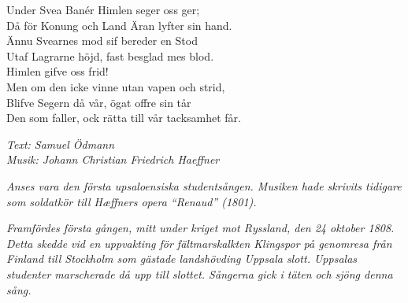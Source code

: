 \vspace{10pt}
Under Svea Banér Himlen seger oss ger;\\
Då för Konung och Land Äran lyfter sin hand.\\
Ännu Svearnes mod sif bereder en Stod\\
Utaf Lagrarne höjd, fast besglad mes blod.\\
Himlen gifve oss frid!\\
Men om den icke vinne utan vapen och strid,\\
Blifve Segern då vår, ögat offre sin tår\\
Den som faller, ock rätta till vår tacksamhet får.\par
\vspace{10pt}
{\footnotesize\textit{Text: Samuel Ödmann\\ Musik: Johann Christian
Friedrich Haeffner}}\par
\vspace{10pt}
{\footnotesize\textit{Anses vara den första upsaloensiska studentsången. Musiken hade
skrivits tidigare som soldatkör till Hæffners opera “Renaud”
(1801).}}\par
\vspace{10pt}
{\footnotesize\textit{Framfördes första gången, mitt under kriget mot Ryssland,
den 24 oktober 1808. Detta skedde vid en
uppvakting för fältmarskalkten Klingspor på genomresa från Finland
till Stockholm som gästade landshövding Uppsala slott.  Uppsalas
studenter marscherade då upp till slottet. Sångerna gick i täten och
sjöng denna sång.}}
